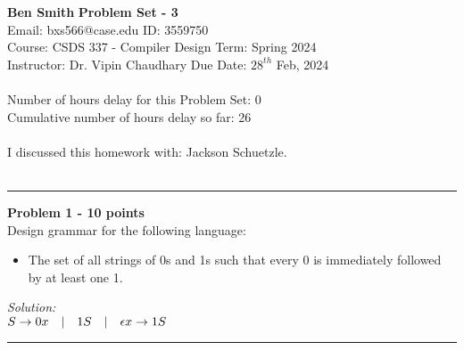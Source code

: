 \documentclass[a4paper, 11pt]{article}
\newenvironment{problem}[2][Problem]
    { \begin{mdframed}[backgroundcolor=gray!20] \textbf{#1 #2} \\}
    {  \end{mdframed}}
\newenvironment{solution}
    {\textit{Solution:}}
    {}
\begin{document}
\noindent
\large\textbf{Ben Smith} \hfill \textbf{Problem Set - 3}   \\
Email: bxs566@case.edu \hfill ID: 3559750 \\
\normalsize Course: CSDS 337 - Compiler Design \hfill Term: Spring 2024\\
Instructor: Dr. Vipin Chaudhary \hfill Due Date: $28^{th}$ Feb, 2024 \\ \\
Number of hours delay for this Problem Set: \hfill 0\\
Cumulative number of hours delay so far: \hfill 26 \\ \\
I discussed this homework with: \hfill Jackson Schuetzle. \\ \\

\noindent\rule{7in}{2.8pt}
\begin{problem}{1 - 10 points}
Design grammar for the following language:

\begin{itemize}
    \item The set of all strings of 0s and 1s such that every 0 is immediately followed by at least one 1.
\end{itemize}

\end{problem}
\begin{solution}\\
    $S \rightarrow 0x \quad | \quad 1S \quad | \quad \epsilon \\
        x \rightarrow 1S$ \\
\end{solution}
\noindent\rule{7in}{2.8pt}

\end{document}
